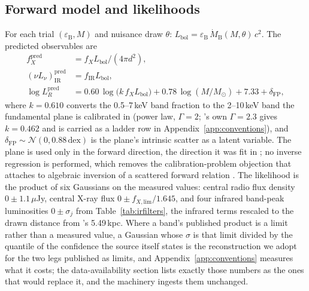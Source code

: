 \documentclass[11pt]{article}
\newcommand{\msun}{\ensuremath{M_\odot}}
\newcommand{\mdotB}{\ensuremath{\dot{M}_{\mathrm{B}}}}
\newcommand{\eps}{\ensuremath{\varepsilon_{\mathrm{B}}}}
\begin{document}
\subsection{Forward model and likelihoods}
\label{sec:likelihood}

For each trial $(\eps, M)$ and nuisance draw $\theta$: $L_{\mathrm{bol}} = \eps\,\mdotB(M,\theta)\,c^{2}$. The predicted observables are
\begin{align}
f_{X}^{\mathrm{pred}} &= f_{X} L_{\mathrm{bol}} / (4\pi d^{2}), \\
(\nu L_{\nu})^{\mathrm{pred}}_{\mathrm{IR}} &= f_{\mathrm{IR}} L_{\mathrm{bol}}, \\
\log L_{R}^{\mathrm{pred}} &= 0.60\,\log\!\big(k\,f_{X} L_{\mathrm{bol}}\big) + 0.78\,\log (M/\msun) + 7.33 + \delta_{\mathrm{FP}},
\end{align}
where $k = 0.610$ converts the 0.5--7\,keV band fraction to the 2--10\,keV band the fundamental plane is calibrated in (power law, $\Gamma = 2$; \citeauthor{Haggard2013}'s own $\Gamma = 2.3$ gives $k = 0.462$ and is carried as a ladder row in Appendix~\ref{app:conventions}), and $\delta_{\mathrm{FP}} \sim \mathcal{N}(0, 0.88\,\mathrm{dex})$ is the plane's intrinsic scatter as a latent variable. The plane is used only in the forward direction, the direction it was fit in \citep{Merloni2003}; no inverse regression is performed, which removes the calibration-problem objection that attaches to algebraic inversion of a scattered forward relation \citep{Plotkin2012}. The likelihood is the product of six Gaussians on the measured values: central radio flux density $0 \pm 1.1\,\mu$Jy, central X-ray flux $0 \pm f_{X,\mathrm{lim}}/1.645$, and four infrared band-peak luminosities $0 \pm \sigma_{j}$ from Table~\ref{tab:irfilters}, the infrared terms rescaled to the drawn distance from \citeauthor{Chen2025JWST}'s 5.49\,kpc. Where a band's published product is a limit rather than a measured value, a Gaussian whose $\sigma$ is that limit divided by the quantile of the confidence the source itself states is the reconstruction we adopt for the two legs published as limits, and Appendix~\ref{app:conventions} measures what it costs; the data-availability section lists exactly those numbers as the ones that would replace it, and the machinery ingests them unchanged.
\end{document}
